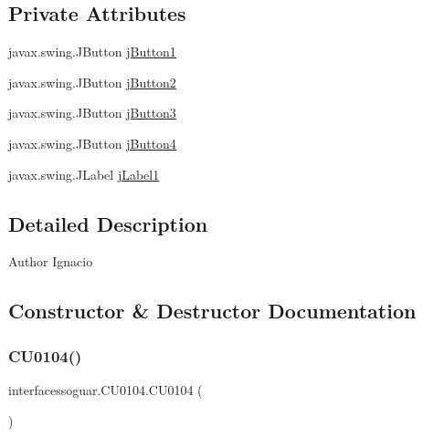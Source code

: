 \subsection*{Private Attributes}
\begin{DoxyCompactItemize}
\item 
javax.\+swing.\+J\+Button \mbox{\hyperlink{classinterfacessoguar_1_1_c_u0104_a14ee464c46b5f60fbf5f0a5788fd04a8}{j\+Button1}}
\item 
javax.\+swing.\+J\+Button \mbox{\hyperlink{classinterfacessoguar_1_1_c_u0104_a6cf10544c20d2e068ba50f9d6e620c6b}{j\+Button2}}
\item 
javax.\+swing.\+J\+Button \mbox{\hyperlink{classinterfacessoguar_1_1_c_u0104_a54322417464e03c0282783a3b1655cfd}{j\+Button3}}
\item 
javax.\+swing.\+J\+Button \mbox{\hyperlink{classinterfacessoguar_1_1_c_u0104_a6330c8387302eb22ad8266154cae3b6a}{j\+Button4}}
\item 
javax.\+swing.\+J\+Label \mbox{\hyperlink{classinterfacessoguar_1_1_c_u0104_ad186ee919c545c2a04b7d0e7099a4e11}{j\+Label1}}
\end{DoxyCompactItemize}


\subsection{Detailed Description}
\begin{DoxyAuthor}{Author}
Ignacio 
\end{DoxyAuthor}


\subsection{Constructor \& Destructor Documentation}
\mbox{\label{classinterfacessoguar_1_1_c_u0104_a0c70e4d803dc65276f8109fa7f5b9896}} 
\subsubsection{\texorpdfstring{C\+U0104()}{CU0104()}}
{\footnotesize\ttfamily interfacessoguar.\+C\+U0104.\+C\+U0104 (\begin{DoxyParamCaption}{ }\end{DoxyParamCaption})\hspace{0.3cm}{\ttfamily [inline]}}

